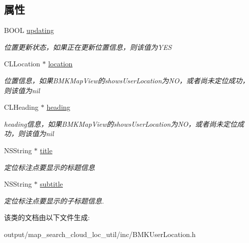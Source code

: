 \subsection*{属性}
\begin{DoxyCompactItemize}
\item 
\hypertarget{interface_b_m_k_user_location_a57e486ccb3b7665183e9e1eaa4d2716e}{B\+O\+O\+L \hyperlink{interface_b_m_k_user_location_a57e486ccb3b7665183e9e1eaa4d2716e}{updating}}\label{interface_b_m_k_user_location_a57e486ccb3b7665183e9e1eaa4d2716e}

\begin{DoxyCompactList}\small\item\em 位置更新状态，如果正在更新位置信息，则该值为\+Y\+E\+S \end{DoxyCompactList}\item 
\hypertarget{interface_b_m_k_user_location_aba4b76e55f4605c5554fe16aca1b4fbf}{C\+L\+Location $\ast$ \hyperlink{interface_b_m_k_user_location_aba4b76e55f4605c5554fe16aca1b4fbf}{location}}\label{interface_b_m_k_user_location_aba4b76e55f4605c5554fe16aca1b4fbf}

\begin{DoxyCompactList}\small\item\em 位置信息，如果\+B\+M\+K\+Map\+View的shows\+User\+Location为\+N\+O，或者尚未定位成功，则该值为nil \end{DoxyCompactList}\item 
\hypertarget{interface_b_m_k_user_location_a23e9a1be042844a326e4bbc589ec613c}{C\+L\+Heading $\ast$ \hyperlink{interface_b_m_k_user_location_a23e9a1be042844a326e4bbc589ec613c}{heading}}\label{interface_b_m_k_user_location_a23e9a1be042844a326e4bbc589ec613c}

\begin{DoxyCompactList}\small\item\em heading信息，如果\+B\+M\+K\+Map\+View的shows\+User\+Location为\+N\+O，或者尚未定位成功，则该值为nil \end{DoxyCompactList}\item 
\hypertarget{interface_b_m_k_user_location_a8fc42845ec226a1af2de73c8dd4d183d}{N\+S\+String $\ast$ \hyperlink{interface_b_m_k_user_location_a8fc42845ec226a1af2de73c8dd4d183d}{title}}\label{interface_b_m_k_user_location_a8fc42845ec226a1af2de73c8dd4d183d}

\begin{DoxyCompactList}\small\item\em 定位标注点要显示的标题信息 \end{DoxyCompactList}\item 
\hypertarget{interface_b_m_k_user_location_af38d7aa4f89637da255ca7308fcaa240}{N\+S\+String $\ast$ \hyperlink{interface_b_m_k_user_location_af38d7aa4f89637da255ca7308fcaa240}{subtitle}}\label{interface_b_m_k_user_location_af38d7aa4f89637da255ca7308fcaa240}

\begin{DoxyCompactList}\small\item\em 定位标注点要显示的子标题信息. \end{DoxyCompactList}\end{DoxyCompactItemize}


该类的文档由以下文件生成\+:\begin{DoxyCompactItemize}
\item 
output/map\+\_\+search\+\_\+cloud\+\_\+loc\+\_\+util/inc/B\+M\+K\+User\+Location.\+h\end{DoxyCompactItemize}
